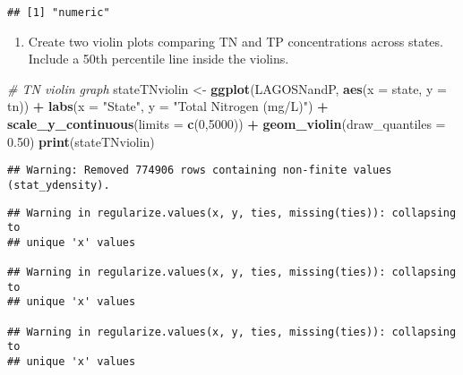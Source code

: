 \documentclass[]{article}
\newenvironment{Shaded}{\begin{snugshade}}{\end{snugshade}}
\newcommand{\CommentTok}[1]{\textcolor[rgb]{0.56,0.35,0.01}{\textit{#1}}}
\newcommand{\DataTypeTok}[1]{\textcolor[rgb]{0.13,0.29,0.53}{#1}}
\newcommand{\DecValTok}[1]{\textcolor[rgb]{0.00,0.00,0.81}{#1}}
\newcommand{\FloatTok}[1]{\textcolor[rgb]{0.00,0.00,0.81}{#1}}
\newcommand{\KeywordTok}[1]{\textcolor[rgb]{0.13,0.29,0.53}{\textbf{#1}}}
\newcommand{\NormalTok}[1]{#1}
\newcommand{\OperatorTok}[1]{\textcolor[rgb]{0.81,0.36,0.00}{\textbf{#1}}}
\newcommand{\StringTok}[1]{\textcolor[rgb]{0.31,0.60,0.02}{#1}}
\providecommand{\tightlist}{%
  \setlength{\itemsep}{0pt}\setlength{\parskip}{0pt}}
\begin{document}
\begin{verbatim}
## [1] "numeric"
\end{verbatim}

\begin{Shaded}
\end{Shaded}

\begin{enumerate}
\def\labelenumi{\arabic{enumi}.}
\setcounter{enumi}{8}
\tightlist
\item
  Create two violin plots comparing TN and TP concentrations across
  states. Include a 50th percentile line inside the violins.
\end{enumerate}

\begin{Shaded}
\begin{Highlighting}[]
\CommentTok{# TN violin graph}
\NormalTok{stateTNviolin <-}\StringTok{ }\KeywordTok{ggplot}\NormalTok{(LAGOSNandP, }\KeywordTok{aes}\NormalTok{(}\DataTypeTok{x =}\NormalTok{ state, }\DataTypeTok{y =}\NormalTok{ tn)) }\OperatorTok{+}
\StringTok{  }\KeywordTok{labs}\NormalTok{(}\DataTypeTok{x =} \StringTok{"State"}\NormalTok{, }\DataTypeTok{y =} \StringTok{"Total Nitrogen (mg/L)"}\NormalTok{) }\OperatorTok{+}
\StringTok{  }\KeywordTok{scale_y_continuous}\NormalTok{(}\DataTypeTok{limits =} \KeywordTok{c}\NormalTok{(}\DecValTok{0}\NormalTok{,}\DecValTok{5000}\NormalTok{)) }\OperatorTok{+}
\StringTok{  }\KeywordTok{geom_violin}\NormalTok{(}\DataTypeTok{draw_quantiles =} \FloatTok{0.50}\NormalTok{)}
\KeywordTok{print}\NormalTok{(stateTNviolin)}
\end{Highlighting}
\end{Shaded}

\begin{verbatim}
## Warning: Removed 774906 rows containing non-finite values (stat_ydensity).
\end{verbatim}

\begin{verbatim}
## Warning in regularize.values(x, y, ties, missing(ties)): collapsing to
## unique 'x' values

## Warning in regularize.values(x, y, ties, missing(ties)): collapsing to
## unique 'x' values

## Warning in regularize.values(x, y, ties, missing(ties)): collapsing to
## unique 'x' values
\end{verbatim}
\end{document}
